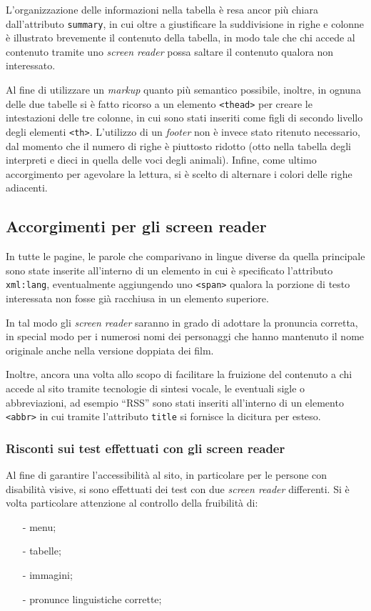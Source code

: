 \documentclass[10pt,a4paper,onecolumn]{article}
\newcommand{\inglese}[1]{\foreignlanguage{english}{\itshape{}#1}}
\begin{document}
L'organizzazione delle informazioni nella tabella è resa ancor più chiara dall'attributo \texttt{summary}, in cui oltre a giustificare la suddivisione in righe e colonne è illustrato brevemente il contenuto della tabella, in modo tale che chi accede al contenuto tramite uno \inglese{screen reader} possa saltare il contenuto qualora non interessato.

Al fine di utilizzare un \inglese{markup} quanto più semantico possibile, inoltre, in ognuna delle due tabelle si è fatto ricorso a un elemento \texttt{<thead>} per creare le intestazioni delle tre colonne, in cui sono stati inseriti come figli di secondo livello degli elementi \texttt{<th>}. L'utilizzo di un \inglese{footer} non è invece stato ritenuto necessario, dal momento che il numero di righe è piuttosto ridotto (otto nella tabella degli interpreti e dieci in quella delle voci degli animali). Infine, come ultimo accorgimento per agevolare la lettura, si è scelto di alternare i colori delle righe adiacenti.

\subsection{Accorgimenti per gli screen reader}
In tutte le pagine, le parole che comparivano in lingue diverse da quella principale sono state inserite all'interno di un elemento in cui è specificato l'attributo \texttt{xml:lang}, eventualmente aggiungendo uno \texttt{<span>} qualora la porzione di testo interessata non fosse già racchiusa in un elemento superiore.

In tal modo gli \inglese{screen reader} saranno in grado di adottare la pronuncia corretta, in special modo per i numerosi nomi dei personaggi che hanno mantenuto il nome originale anche nella versione doppiata dei film.

Inoltre, ancora una volta allo scopo di facilitare la fruizione del contenuto a chi accede al sito tramite tecnologie di sintesi vocale, le eventuali sigle o abbreviazioni, ad esempio ``RSS'' sono stati inseriti all'interno di un elemento \texttt{<abbr>} in cui tramite l'attributo \texttt{title} si fornisce la dicitura per esteso.
\subsubsection{Risconti sui test effettuati con gli screen reader}
Al fine di garantire l'accessibilità al sito, in particolare per le persone con disabilità visive, si sono effettuati dei test con due  \inglese{screen reader} differenti. 
Si è volta particolare attenzione al controllo della fruibilità di:
\begin{itemize}[noitemsep,nolistsep]
  \item[-] menu;
  \item[-] tabelle;
  \item[-] immagini;
  \item[-] pronunce linguistiche corrette;
\end{itemize}
\end{document}
